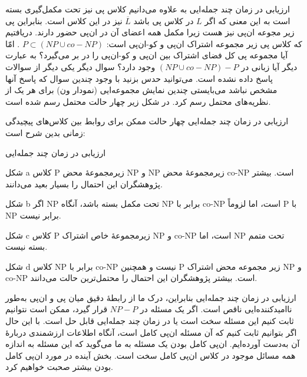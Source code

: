 \begin{itemframe}{ارزیابی در زمان چند جمله‌ایی}
\itm
به علاوه می‌دانیم کلاس پی نیز تحت مکمل‌گیری بسته است به این معنی که اگر $ L $ در کلاس پی باشد $ \overbar{L} $ نیز در این کلاس است. بنابراین پی زیر مجوعه ان‌پی نیز هست زیرا مکمل همه اعضای آن در ان‌پی حضور دارند.
\itm
دریافتیم که کلاس پی زیر مجموعه اشتراک ان‌پی و کو-ان‌پی است: $ P \subset (NP \cup co-NP)$ . امّا آیا مجموعه پی کل فضای اشتراک بین ان‌پی و کو-ان‌پی را در بر می‌گیرد؟ به عبارت دیگر آیا زبانی در $(NP \cup co-NP) -P $ وجود دارد؟
\itm
سوال دیگر یکی دیگر از سوالات پاسخ داده نشده است. می‌توانید حدس بزنید با وجود چندین سوال که پاسخ آنها مشخص نباشد می‌بایستی چندین نمایش مجموعه‌ایی (نمودار ون) برای هر یک از نظریه‌های محتمل رسم کرد. در شکل زیر چهار حالت محتمل رسم شده است.
\end{itemframe}

\begin{itemframe}{ارزیابی در زمان چند جمله‌ایی}
\itm
چهار حالت ممکن برای روابط بین کلاس‌های پیچیدگی زمانی بدین شرح است:
\end{itemframe}

\begin{itemframe}{ارزیابی در زمان چند جمله‌ایی}
\item[شکل a]
کلاس P زیرمجموعهٔ محض NP و NP زیرمجموعهٔ محض co-NP است. بیشتر پژوهشگران این احتمال را بسیار بعید می‌دانند.
\item[شکل b]
اگر NP تحت مکمل بسته باشد، آنگاه NP برابر با co-NP است، اما لزوماً P با NP برابر نیست.
\item[شکل c]
کلاس P زیرمجموعهٔ خاص اشتراک NP و co-NP است، اما NP تحت متمم بسته نیست.
\item[شکل d]
کلاس NP برابر با co-NP نیست و همچنین P زیر مجموعه محض اشتراک NP و co-NP است. بیشتر پژوهشگران این احتمال را محتمل‌ترین حالت می‌دانند.
\end{itemframe}

\begin{itemframe}{ارزیابی در زمان چند جمله‌ایی}
\itm
بنابراین، درک ما از رابطهٔ دقیق میان پی و ان‌پی به‌طور ناامیدکننده‌ایی ناقص است. اگر یک مسئله در $ NP - P $ قرار گیرد، ممکن است نتوانیم ثابت کنیم این مسئله سخت است یا در زمان چند جمله‌ایی قابل حل است.
\itm
با این حال اگر بتوانیم ثابت کنیم که آن مسئله ان‌پی کامل است، آنگاه اطلاعات ارزشمندی دربارهٔ آن به‌دست آورده‌ایم. ان‌پی کامل بودن یک مسئله به ما می‌گوید که این مسئله به اندازه همه مسائل موجود در کلاس ان‌پی کامل سخت است.
\itm
بخش آینده در مورد  ان‌پی کامل بودن بیشتر صحبت خواهیم کرد.
\end{itemframe}


